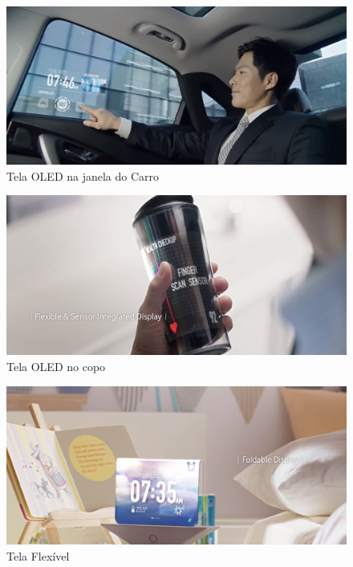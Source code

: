 \begin{figure}[!ht]
  \centering
  \includegraphics[width=.90\textwidth]{./figuras/oled-future1} 
  \caption{Tela OLED na janela do Carro}
  \label{fig:oled-future1} 
\end{figure}

\begin{figure}[!ht]
  \centering
  \includegraphics[width=.90\textwidth]{./figuras/oled-future2} 
  \caption{Tela OLED no copo}
  \label{fig:oled-future2} 
\end{figure}

\begin{figure}[!ht]
  \centering
  \includegraphics[width=.90\textwidth]{./figuras/oled-future3} 
  \caption{Tela Flexível}
  \label{fig:oled-future3} 
\end{figure}

